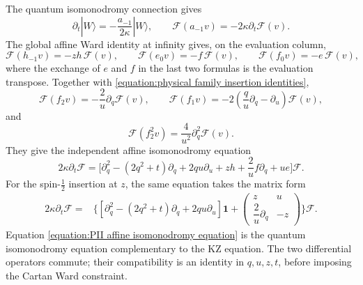 \documentclass[a4paper,11pt]{article}
\newcommand{\cF}{\mathcal{F}}
\numberwithin{equation}{section}
\begin{document}
The quantum isomonodromy connection gives
\begin{equation}
 \partial_{t}|W\rangle=-\frac{a_{-1}}{2\kappa}|W\rangle,
 \qquad
 \cF(a_{-1}v)=-2\kappa\partial_{t}\cF(v).
\end{equation}
The global affine Ward identity at infinity gives, on the evaluation column,
\begin{equation}
	\cF(h_{-1}v)=-zh\,\cF(v),
	\qquad
	\cF(e_{0}v)=-f\,\cF(v),
	\qquad
	\cF(f_{0}v)=-e\,\cF(v),
\end{equation}
where the exchange of $e$ and $f$ in the last two formulas is the evaluation transpose.
Together with \eqref{equation:physical family insertion identities},
\begin{equation}
	\cF(f_{2}v)=-\frac{2}{u}\partial_{q}\cF(v),
	\qquad
	\cF(f_{1}v)=-2\left(\frac{q}{u}\partial_{q}-\partial_{u}\right)\cF(v),
\end{equation}
and
\begin{equation}
	\cF(f_{2}^{2}v)=\frac{4}{u^{2}}\partial_{q}^{2}\cF(v).
\end{equation}
They give the independent affine isomonodromy equation
\begin{equation}
	\label{equation:PII affine isomonodromy equation}
	2\kappa\partial_{t}\cF
		=
		\Bigg[
		\partial_{q}^{2}
		-\left(2q^{2}+t\right)\partial_{q}
		+2qu\partial_{u}
		+zh
		+\frac{2}{u}f\partial_{q}
		+ue
		\Bigg]\cF.
\end{equation}
For the spin-$\frac{1}{2}$ insertion at $z$, the same equation takes
the matrix form
\begin{equation}
	\label{equation:PII physical matrix isomonodromy equation}
	\begin{aligned}
		2\kappa\partial_{t}\cF
		={}&
		\Bigg\{
		\left[
		\partial_{q}^{2}
		-\left(2q^{2}+t\right)\partial_{q}
		+2qu\partial_{u}
		\right]\mathbf{1}
		+
		\begin{pmatrix}
			z&u\\[2mm]
			\dfrac{2}{u}\partial_{q}&-z
		\end{pmatrix}
		\Bigg\}\cF.
	\end{aligned}
\end{equation}
Equation
\eqref{equation:PII affine isomonodromy equation} is the quantum
isomonodromy equation complementary to the KZ equation.
The two differential operators commute; their compatibility is an
identity in $q,u,z,t$, before imposing the Cartan Ward constraint.\
\vspace{2 mm}
\end{document}
